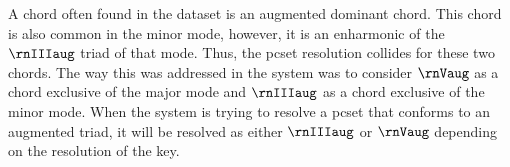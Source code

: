 
A chord often found in the dataset is an augmented dominant
chord. This chord is also common in the minor mode, however,
it is an enharmonic of the $\rnIIIaug$ triad of that mode.
Thus, the \gls{pcset} resolution collides for these two
chords. The way this was addressed in the system was to
consider $\rnVaug$ as a chord exclusive of the major mode and
$\rnIIIaug$ as a chord exclusive of the minor mode. When the
system is trying to resolve a \gls{pcset} that conforms to
an augmented triad, it will be resolved as either $\rnIIIaug$
or $\rnVaug$ depending on the resolution of the key. 
